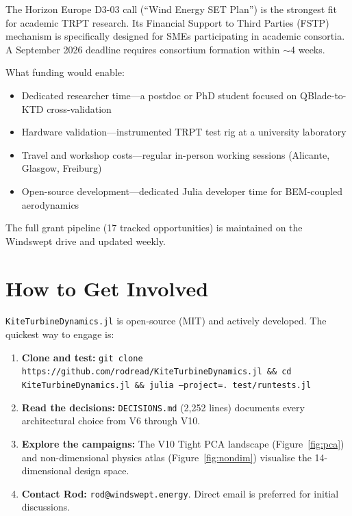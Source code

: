 \documentclass[11pt,a4paper]{article}
\begin{document}
The Horizon Europe D3-03 call (``Wind Energy SET Plan'') is the strongest fit for academic TRPT research.
Its Financial Support to Third Parties (FSTP) mechanism is specifically designed for SMEs participating in academic consortia.
A September 2026 deadline requires consortium formation within $\sim$4 weeks.

What funding would enable:
\begin{itemize}
\item Dedicated researcher time---a postdoc or PhD student focused on QBlade-to-KTD cross-validation
\item Hardware validation---instrumented TRPT test rig at a university laboratory
\item Travel and workshop costs---regular in-person working sessions (Alicante, Glasgow, Freiburg)
\item Open-source development---dedicated Julia developer time for BEM-coupled aerodynamics
\end{itemize}

The full grant pipeline (17 tracked opportunities) is maintained on the Windswept drive and updated weekly.

\section{How to Get Involved}

\texttt{KiteTurbineDynamics.jl} is open-source (MIT) and actively developed.
The quickest way to engage is:

\begin{enumerate}
\item \textbf{Clone and test:} \texttt{git clone https://github.com/rodread/KiteTurbineDynamics.jl \&\& cd KiteTurbineDynamics.jl \&\& julia --project=. test/runtests.jl}
\item \textbf{Read the decisions:} \texttt{DECISIONS.md} (2,252 lines) documents every architectural choice from V6 through V10.
\item \textbf{Explore the campaigns:} The V10 Tight PCA landscape (Figure~\ref{fig:pca}) and non-dimensional physics atlas (Figure~\ref{fig:nondim}) visualise the 14-dimensional design space.
\item \textbf{Contact Rod:} \texttt{rod@windswept.energy}. Direct email is preferred for initial discussions.
\end{enumerate}
\end{document}
